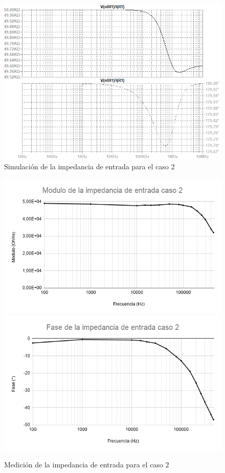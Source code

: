 \begin{figure}[H]
\begin{centering}
\includegraphics[scale=0.5]{../Ex1/iB/Resources1b/zinp2_sim}
\par\end{centering}
\caption{Simulación de la impedancia de entrada para el caso 2}
\end{figure}

\begin{figure}[H]
\begin{centering}
\includegraphics[scale=0.4]{../Ex1/iB/Resources1b/zinp2_m_med}\includegraphics[scale=0.4]{../Ex1/iB/Resources1b/zinp2_p_med}
\par\end{centering}
\caption{Medición de la impedancia de entrada para el caso 2}
\end{figure}

